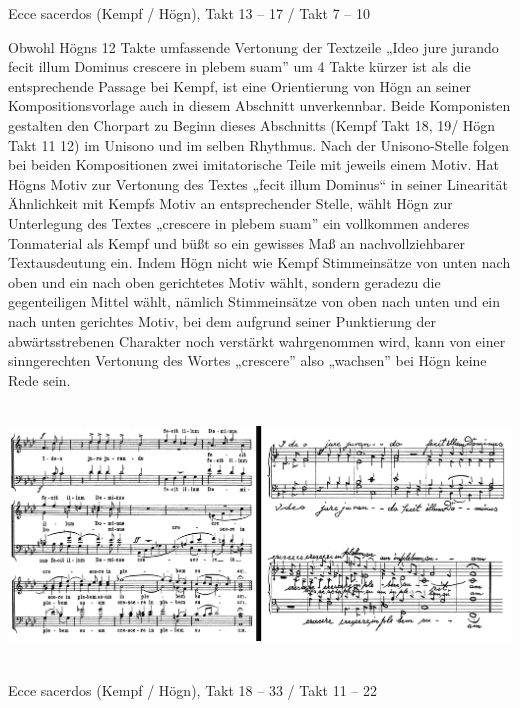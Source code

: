 \begin{figure}
\img{}
\caption{}
\end{figure}

Ecce sacerdos (Kempf / Högn), Takt 13 –
17 / Takt 7 – 10

Obwohl Högns 12 Takte umfassende Vertonung der Textzeile „Ideo jure
jurando fecit illum Dominus crescere in plebem suam” um 4 Takte kürzer
ist als die entsprechende Passage bei Kempf, ist eine Orientierung von
Högn an seiner Kompositionsvorlage auch in diesem Abschnitt
unverkennbar. Beide Komponisten gestalten den Chorpart zu Beginn dieses
Abschnitts (Kempf Takt 18, 19/ Högn Takt 11 12) im Unisono und im
selben Rhythmus. Nach der Unisono-Stelle folgen bei beiden
Kompositionen zwei imitatorische Teile mit jeweils einem Motiv. Hat
Högns Motiv zur Vertonung des Textes „fecit illum Dominus“ in seiner
Linearität Ähnlichkeit mit Kempfs Motiv an entsprechender Stelle, wählt
Högn zur Unterlegung des Textes „crescere in plebem suam” ein
vollkommen anderes Tonmaterial als Kempf und büßt so ein gewisses Maß
an nachvollziehbarer Textausdeutung ein. Indem Högn nicht wie Kempf
Stimmeinsätze von unten nach oben und ein nach oben gerichtetes Motiv
wählt, sondern geradezu die gegenteiligen Mittel wählt, nämlich
Stimmeinsätze von oben nach unten und ein nach unten gerichtes Motiv,
bei dem aufgrund seiner Punktierung der abwärtsstrebenen Charakter noch
verstärkt wahrgenommen wird, kann von einer sinngerechten Vertonung des
Wortes „crescere” also „wachsen” bei Högn keine Rede sein.


\includegraphics[width=15.967cm,height=6.828cm]{pictures/zulassungsarbeit-img087.png}

\begin{figure}
\img{}
\caption{}
\end{figure}

Ecce sacerdos (Kempf / Högn), Takt 18 –
 33 / Takt 11 –  22

